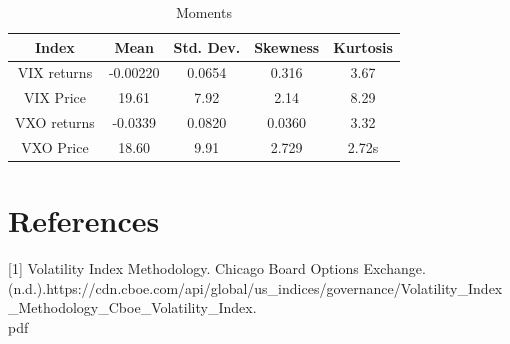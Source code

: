 \documentclass[12pt, a4paper]{article}
\theoremstyle{definition}
\begin{document}
\begin{table}[h!]
	\caption{Moments}
	\centering
	\begin{tabular}{c c c c c}
		\hline \hline
		Index & Mean & Std. Dev. & Skewness & Kurtosis\\
		\hline
		VIX returns & -0.00220 & 0.0654 & 0.316 & 3.67\\
		VIX Price & 19.61 & 7.92 & 2.14 & 8.29\\
		VXO returns & -0.0339 &0.0820 & 0.0360 & 3.32\\
		VXO Price & 18.60 & 9.91 & 2.729 &2.72s 
	\end{tabular}
\end{table}
\newpage 
\section{References}
	 [1] Volatility Index Methodology. Chicago Board Options Exchange. (n.d.).\newline  https://cdn.cboe.com/api/global/us\_indices/governance/Volatility\_Index\_Methodology\_Cboe\_Volatility\_Index. \\ pdf 
\end{document}
